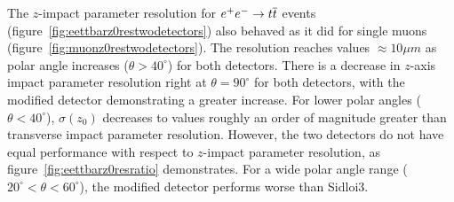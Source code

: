 The $z$-impact parameter resolution for $\ee \rightarrow \ttbar$ events (figure~\ref{fig:eettbarz0restwodetectors}) 
also behaved as it did for single muons (figure~\ref{fig:muonz0restwodetectors}).
The resolution reaches values $\approx 10 \mu m$ as polar angle increases ($\theta > 40^{\circ}$) for both detectors.
There is a decrease
in $z$-axis impact parameter resolution right at $\theta = 90^{\circ}$ for both detectors, with the modified
detector demonstrating a greater increase. 
For lower polar angles ($\theta < 40^{\circ}$), $\sigma(z_{0})$ decreases to values roughly
an order of magnitude greater than transverse impact parameter resolution.
However, the two detectors do not have equal performance
with respect to $z$-impact parameter resolution, as figure~\ref{fig:eettbarz0resratio} demonstrates.
For a wide polar angle range ($20^{\circ} < \theta < 60^{\circ}$), the modified detector performs
worse than Sidloi3.

